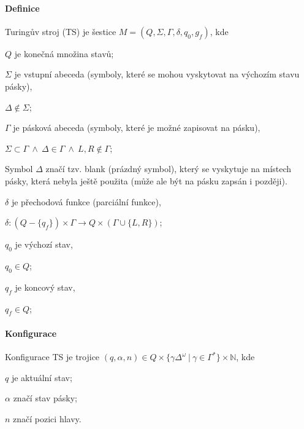 \paragraph*{Definice} Turingův stroj (TS) je šestice $M = (Q, \Sigma, \Gamma, \delta, q_0, g_f)$, kde \begin{compactitem}
    \item $Q$ je konečná množina stavů;

    \item $\Sigma$ je vstupní abeceda (symboly, které se mohou vyskytovat na výchozím stavu pásky), \begin{compactitem}
        \item $\Delta \not\in \Sigma$;
    \end{compactitem}

    \item $\Gamma$ je pásková abeceda (symboly, které je možné zapisovat na pásku), \begin{compactitem}
        \item $\Sigma \subset \Gamma ~\land~ \Delta \in \Gamma ~\land~ L, R \not\in \Gamma$;
        \item Symbol $\Delta$ značí tzv. blank (prázdný symbol), který se vyskytuje na místech pásky,
        která nebyla ještě použita (může ale být na pásku zapsán i později).
    \end{compactitem}

    \item $\delta$ je přechodová funkce (parciální funkce), \begin{compactitem}
        \item $\delta : (Q - \{ q_f \}) \times \Gamma \rightarrow Q \times (\Gamma \cup \{ L, R \})$;
    \end{compactitem}

    \item $q_0$ je výchozí stav, \begin{compactitem}
        \item $q_0 \in Q$;
    \end{compactitem}

    \item $q_f$ je koncový stav, \begin{compactitem}
        \item $q_f \in Q$;
    \end{compactitem}
\end{compactitem}

\paragraph*{Konfigurace} Konfigurace TS je trojice $(q, \alpha, n) \in Q \times \{ \gamma \Delta^{\omega} ~|~ \gamma \in \Gamma^* \} \times \mathbb{N}$, kde \begin{compactitem}
    \item $q$ je aktuální stav;
    \item $\alpha$ značí stav pásky;
    \item $n$ značí pozici hlavy.
\end{compactitem}


